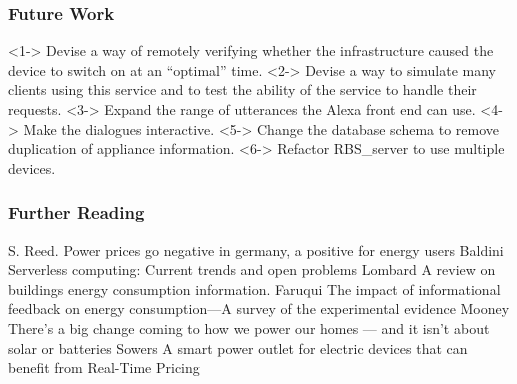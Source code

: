 \documentclass{beamer}
\begin{document}
\begin{frame}
    \frametitle{Future Work}
    \begin{outline}
        \1 <1-> Devise a way of remotely 
        verifying whether the infrastructure caused the device to switch on at an ``optimal'' time.
        \1 <2-> Devise a way to simulate many clients using this service and to test the ability of the service to handle their requests.
        \1 <3-> Expand the range of utterances the Alexa front end can use.
        \1 <4-> Make the dialogues interactive.
        \1 <5-> Change the database schema to remove duplication of appliance information.
        \1 <6-> Refactor RBS\_server to use
        multiple devices.
    \end{outline}
\end{frame}

\begin{frame}[allowframebreaks]
  \frametitle<presentation>{Further Reading}    
  \begin{thebibliography}{10}    
  \beamertemplatearticlebibitems
    S. Reed.
    \newblock Power prices go negative in germany, a positive for energy
users    
  \beamertemplatearticlebibitems
    Baldini
    \newblock Serverless computing: Current trends and open problems
  \beamertemplatearticlebibitems
    Lombard
    \newblock A review on buildings energy consumption information.
  \beamertemplatearticlebibitems
  Faruqui
    \newblock The impact of informational feedback on energy consumption—A survey of the experimental evidence
  \beamertemplatearticlebibitems
  Mooney
    \newblock There’s a big change coming to how we power our homes — and it isn’t about solar or batteries
  \beamertemplatearticlebibitems
  Sowers
    \newblock A smart power outlet for electric devices that can benefit from Real-Time Pricing
  \end{thebibliography}
\end{frame}
\end{document}
